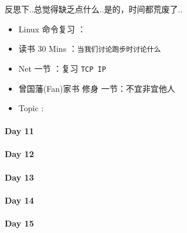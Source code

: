 \documentclass[UTF8,a4paper,8pt]{ctexart}
\begin{document}
	 	 反思下..总觉得缺乏点什么..是的，时间都荒废了..
	 	 \begin{itemize}[itemindent = 1em]
	 	 	\renewcommand\labelitemi{\makebox[0pt][l]{$\square$}\hspace{1em}} 
	 	 	\renewcommand\labelitemi{\makebox[0pt][l]{$\square$}\raisebox{.15ex}{\hspace{0.1em}$\checkmark$}}	 	
	 	 	\item   Linux 命令复习 ：
	 	 	
	 	 	\item   读书  30 Mins	：\verb|当我们讨论跑步时讨论什么|
	 	 	\item   Net 一节 ：复习 \verb|TCP IP|	
	 	 	\renewcommand\labelitemi{\makebox[0pt][l]{$\square$}\hspace{1em}} 
	 	 	
	 	 	
	 	 	\renewcommand\labelitemi{\makebox[0pt][l]{$\square$}\raisebox{.15ex}{\hspace{0.1em}$\checkmark$}}
	 	 	\item   曾国藩(Fan)家书 修身 一节：不宜非宜他人
	 	 	\item   Topic :
	 	 \end{itemize}
 	 \paragraph{Day 11      \quad     }
 	 \paragraph{Day 12      \quad     }
 	 \paragraph{Day 13      \quad     }
 	 \paragraph{Day 14      \quad     }
 	 \paragraph{Day 15      \quad     }
\end{document}
